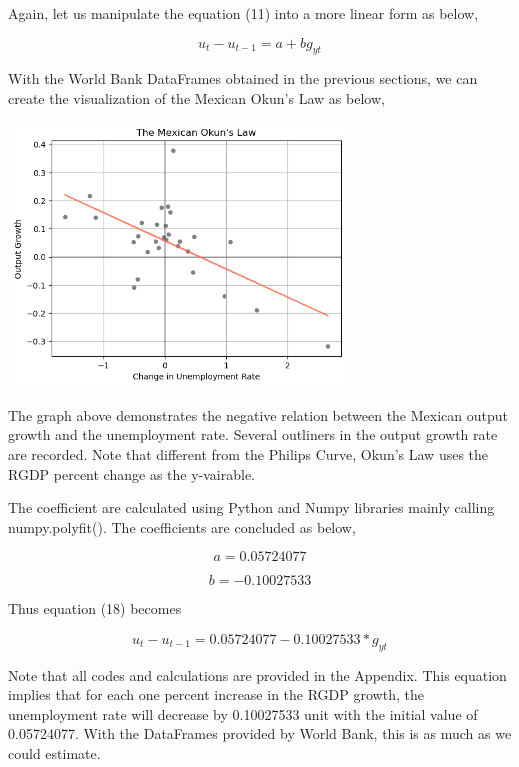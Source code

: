 \documentclass{article}
\begin{document}
    {Again, let us manipulate the equation (11) into a more linear form as below,}

    \begin{equation}
        u_t - u_{t-1} = a + b g_{yt}
    \end{equation}

    {With the World Bank DataFrames obtained in the previous sections, we can create the visualization of the Mexican Okun's Law as below,}

    \begin{center}
        \includegraphics[width=9cm, height=7cm]{Mexican Okun's Law.png}
    \end{center}

    {The graph above demonstrates the negative relation between the Mexican output growth and the unemployment rate. Several outliners in the output growth rate are recorded. Note that different from the Philips Curve, Okun's Law uses the RGDP percent change as the y-vairable.}

    {The coefficient are calculated using Python and Numpy libraries mainly calling numpy.polyfit(). The coefficients are concluded as below,}

    \begin{equation}
        a = 0.05724077
    \end{equation}

    \begin{equation}
        b = -0.10027533
    \end{equation}

    {Thus equation (18) becomes}

    \begin{equation}
        u_t - u_{t-1} = 0.05724077 - 0.10027533*g_{yt}
    \end{equation}

    {Note that all codes and calculations are provided in the Appendix. This equation implies that for each one percent increase in the RGDP growth, the unemployment rate will decrease by 0.10027533 unit with the initial value of 0.05724077. With the DataFrames provided by World Bank, this is as much as we could estimate.}
\end{document}
